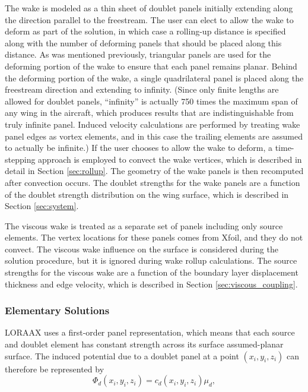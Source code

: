 \documentclass[11pt]{article}
\begin{document}
The wake is modeled as a thin sheet of doublet panels initially extending along
the direction parallel to the freestream. The user can elect to allow the wake
to deform as part of the solution, in which case a rolling-up distance is
specified along with the number of deforming panels that should be placed along
this distance. As was mentioned previously, triangular panels are used for the
deforming portion of the wake to ensure that each panel remains planar. Behind
the deforming portion of the wake, a single quadrilateral panel is placed along
the freestream direction and extending to infinity. (Since only finite
lengths are allowed for doublet panels, ``infinity'' is actually 750 times the
maximum span of any wing in the aircraft, which produces results that are
indistinguishable from truly infinite panel. Induced velocity calculations are
performed by treating wake panel edges as vortex elements, and in this case the
trailing elements are assumed to actually be infinite.) If the user chooses to
allow the wake to deform, a time-stepping approach is employed to convect the
wake vertices, which is described in detail in Section \ref{sec:rollup}. The
geometry of the wake panels is then recomputed after convection occurs. The
doublet strengths for the wake panels are a function of the doublet strength
distribution on the wing surface, which is described in Section
\ref{sec:system}.

The viscous wake is treated as a separate set of panels including only source
elements. The vertex locations for these panels comes from Xfoil, and they do
not convect. The viscous wake influence on the surface is considered during the
solution procedure, but it is ignored during wake rollup calculations. The
source strengths for the viscous wake are a function of the boundary layer
displacement thickness and edge velocity, which is described in Section
\ref{sec:viscous_coupling}.

\subsubsection{Elementary Solutions}

LORAAX uses a first-order panel representation, which means that each source and
doublet element has constant strength across its surface assumed-planar surface.
The induced potential due to a doublet panel at a point $(x_i, y_i, z_i)$ can
therefore be represented by
\begin{equation}
	\Phi_d(x_i,y_i,z_i) = c_d(x_i,y_i,z_i)\mu_d,
	\label{eq:doublet}
\end{equation}
\end{document}
